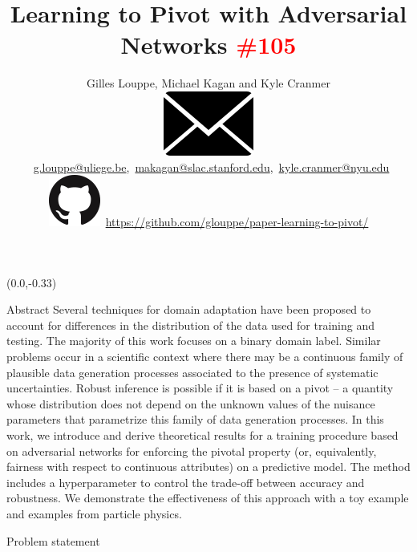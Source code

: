 \documentclass[final,unknownkeysallowed]{beamer}
\title{\bf Learning to Pivot with Adversarial Networks \textcolor{red}{\#105}}
\author{Gilles Louppe, Michael Kagan and Kyle Cranmer\\[1.5ex]
{\tiny
\includegraphics[scale=0.3]{images/mail.png}~\url{g.louppe@uliege.be},~\url{makagan@slac.stanford.edu},~\url{kyle.cranmer@nyu.edu} \\[1.5ex]
\includegraphics[scale=0.35]{images/github.png}~\url{https://github.com/glouppe/paper-learning-to-pivot/}
}}
\date{}
\begin{document}
\begin{frame}{}



\begin{textblock}{0.32}(0.0,-0.33)


\begin{block}{Abstract \phantom{p}}
Several techniques for domain adaptation have been proposed to account for
differences in the distribution of the data used for training and testing. The
majority of this work focuses on a binary domain label. Similar problems occur
in a scientific context where there may be a continuous family of plausible data
generation processes associated to the presence of systematic uncertainties.
Robust inference is possible if it is based on a {\color{blue}pivot -- a quantity whose
distribution does not depend on the unknown values of the nuisance parameters
that parametrize this family of data generation processes}. In this work,  we
introduce and derive theoretical results for {\color{red} a training procedure based on
adversarial networks for enforcing the pivotal property (or, equivalently,
fairness with respect to continuous attributes) on a predictive model.} The
method includes a hyperparameter to control the trade-off between accuracy and
robustness. We demonstrate the effectiveness of this approach with a toy example
and examples from particle physics.
\end{block}

\vspace{0.5cm}
\begin{block}{Problem statement \phantom{p}}


\end{block}
\end{textblock}
\end{frame}
\end{document}
